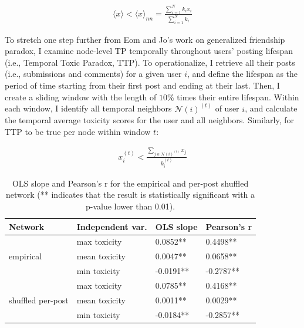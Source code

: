 \documentclass[10pt,twocolumn,letterpaper]{article}
\begin{document}
\begin{align*}
\langle x \rangle < \langle x \rangle_{nn} = \frac{\sum_{i=1}^N{k_ix_i}}{\sum_{i=1}^N{k_i}}	
\end{align*}

To stretch one step further from Eom and Jo's work on generalized friendship paradox, I examine node-level TP temporally throughout users' posting lifespan (i.e., Temporal Toxic Paradox, TTP). To operationalize, I retrieve all their posts (i.e., submissions and comments) for a given user $i$, and define the lifespan as the period of time starting from their first post and ending at their last. Then, I create a sliding window with the length of $10\%$ times their entire lifespan. Within each window, I identify all temporal neighbors $\mathcal{N}(i)^{(t)}$ of user $i$, and calculate the temporal average toxicity scores for the user and all neighbors. Similarly, for TTP to be true per node within window $t$:

\begin{align*}
x_i^{(t)} < \frac{\sum_{j \in \mathcal{N}(i)^{(t)}}x_j}{k_i^{(t)}}	
\end{align*}

\begin{table}[ht]
\centering
\begin{tabular}{l|lll}
Network                            & Independent var. & OLS slope & Pearson's r \\ \hline
\multirow{3}{*}{empirical}         & max toxicity         & 0.0852**  & 0.4498**    \\
                                   & mean toxicity        & 0.0047**  & 0.0658**    \\
                                   & min toxicity         & -0.0191** & -0.2787**   \\
\multirow{3}{*}{shuffled per-post} & max toxicity         & 0.0785**  & 0.4168**    \\
                                   & mean toxicity        & 0.0011**  & 0.0029**    \\
                                   & min toxicity         & -0.0184** & -0.2857**  
\end{tabular}
\caption{OLS slope and Pearson's r for the empirical and per-post shuffled network (** indicates that the result is statistically significant with a p-value lower than 0.01).}
\label{tab:corr-emp-rd}
\end{table}
\end{document}
